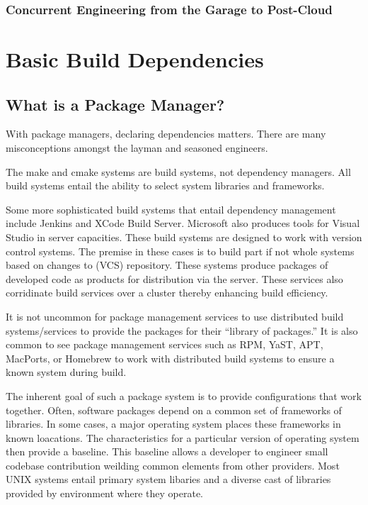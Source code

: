 \documentclass[
  a4paper, %
  11pt, %
  twoside,    %
  onecolumn,  %
  openright,  %
]{memoir}
\begin{document}

\section{Concurrent Engineering from the Garage to Post-Cloud} %
\label{sec:concurrent_engineering_from_the_garage_to_post_cloud}



\mainmatter




\part{Basic Build Dependencies}

\chapter[Chapter 1 TOC entry][Chapter One Heading]{What is a Package Manager?}
With package managers, declaring dependencies matters.  There are many misconceptions amongst the layman and seasoned engineers.  

The make and cmake systems are build systems, not dependency managers.  All build systems entail the ability to select system libraries and frameworks. 

Some more sophisticated build systems that entail dependency management include Jenkins and XCode Build Server.  Microsoft also produces tools for Visual Studio in server capacities.  %
These build systems are designed to work with version control systems.  The premise in these cases is to build part if not whole systems based on changes to (VCS) repository.  These systems produce packages of developed code as products for distribution via the server.  These services also corridinate build services over a cluster thereby enhancing build efficiency.  

It is not uncommon for package management services to use distributed build systems/services to provide the packages for their ``library of packages.''  It is also common to see package management services such as RPM, YaST, APT, MacPorts, or Homebrew to work with distributed build systems to ensure a known system during build.

The inherent goal of such a package system is to provide configurations that work together.  Often, software packages depend on a common set of frameworks of libraries.  In some cases, a major operating system places these frameworks in known loacations.  The characteristics for a particular version of operating system then provide a baseline.  This baseline allows a developer to engineer small codebase contribution weilding common elements from other providers.  Most UNIX systems entail primary system libaries and a diverse cast of libraries provided by environment where they operate.  
\end{document}
